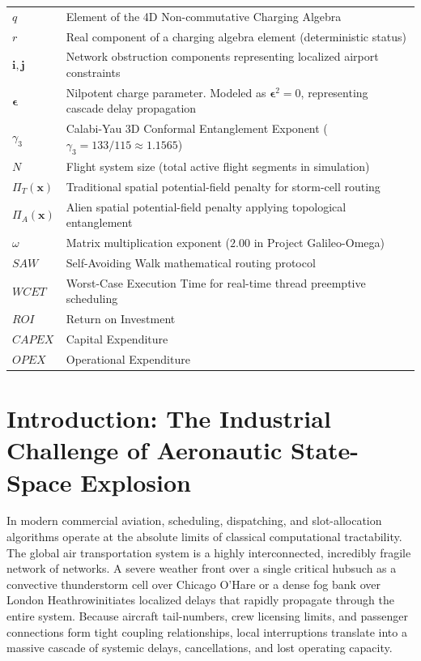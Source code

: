 \documentclass[11pt,a4paper]{book}
\begin{document}
\begin{tabular}{ll}
    $q$ & Element of the 4D Non-commutative Charging Algebra \\
    $r$ & Real component of a charging algebra element (deterministic status) \\
    $\mathbf{i}, \mathbf{j}$ & Network obstruction components representing localized airport constraints \\
    $\bm{\epsilon}$ & Nilpotent charge parameter. Modeled as $\bm{\epsilon}^2 = 0$, representing cascade delay propagation \\
    $\gamma_3$ & Calabi-Yau 3D Conformal Entanglement Exponent ($\gamma_3 = 133/115 \approx 1.1565$) \\
    $N$ & Flight system size (total active flight segments in simulation) \\
    $\Pi_T(\mathbf{x})$ & Traditional spatial potential-field penalty for storm-cell routing \\
    $\Pi_A(\mathbf{x})$ & Alien spatial potential-field penalty applying topological entanglement \\
    $\omega$ & Matrix multiplication exponent ($2.00$ in Project Galileo-Omega) \\
    $SAW$ & Self-Avoiding Walk mathematical routing protocol \\
    $WCET$ & Worst-Case Execution Time for real-time thread preemptive scheduling \\
    $ROI$ & Return on Investment \\
    $CAPEX$ & Capital Expenditure \\
    $OPEX$ & Operational Expenditure \\
\end{tabular}

\section{Introduction: The Industrial Challenge of Aeronautic State-Space Explosion}\label{sec:ch9_intro}

In modern commercial aviation, scheduling, dispatching, and slot-allocation algorithms operate at the absolute limits of classical computational tractability. The global air transportation system is a highly interconnected, incredibly fragile network of networks. A severe weather front over a single critical hubsuch as a convective thunderstorm cell over Chicago O'Hare or a dense fog bank over London Heathrowinitiates localized delays that rapidly propagate through the entire system. Because aircraft tail-numbers, crew licensing limits, and passenger connections form tight coupling relationships, local interruptions translate into a massive cascade of systemic delays, cancellations, and lost operating capacity.
\end{document}
